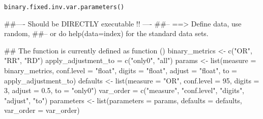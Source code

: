 \begin{Usage}
\begin{verbatim}
binary.fixed.inv.var.parameters()
\end{verbatim}
\end{Usage}
\begin{Examples}
\begin{ExampleCode}
##---- Should be DIRECTLY executable !! ----
##-- ==>  Define data, use random,
##--    or do  help(data=index)  for the standard data sets.

## The function is currently defined as
function () 
{
    binary_metrics <- c("OR", "RR", "RD")
    apply_adjustment_to = c("only0", "all")
    params <- list(measure = binary_metrics, conf.level = "float", 
        digits = "float", adjust = "float", to = apply_adjustment_to)
    defaults <- list(measure = "OR", conf.level = 95, digits = 3, 
        adjust = 0.5, to = "only0")
    var_order = c("measure", "conf.level", "digits", "adjust", 
        "to")
    parameters <- list(parameters = params, defaults = defaults, 
        var_order = var_order)
  }
\end{ExampleCode}
\end{Examples}

